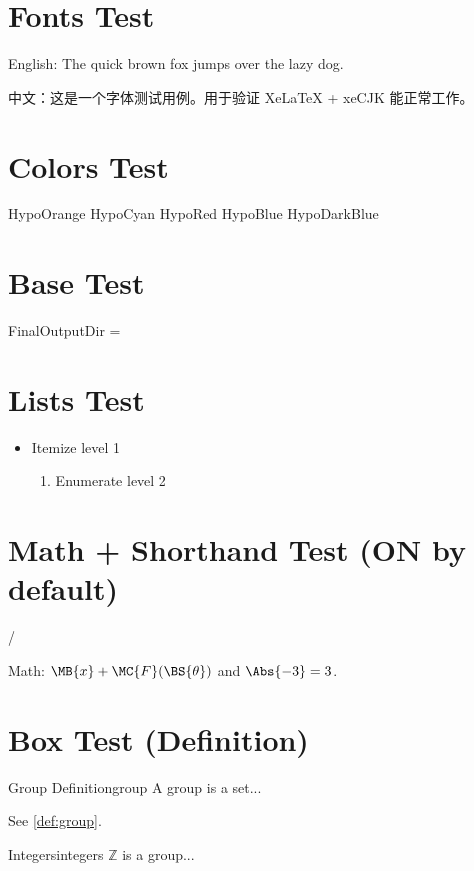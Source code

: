 \documentclass{article}
\begin{document}
\section*{Fonts Test}

English: The quick brown fox jumps over the lazy dog.

中文：这是一个字体测试用例。用于验证 XeLaTeX + xeCJK 能正常工作。

\section*{Colors Test}
{\color{HypoOrange}HypoOrange}\quad
{\color{HypoCyan}HypoCyan}\quad
{\color{HypoRed}HypoRed}\quad
{\color{HypoBlue}HypoBlue}\quad
{\color{HypoDarkBlue}HypoDarkBlue}

\section*{Base Test}
FinalOutputDir = \texttt{\FinalOutputDir}

\section*{Lists Test}
\begin{itemize}
  \item Itemize level 1
  \begin{enumerate}
    \item Enumerate level 2
  \end{enumerate}
\end{itemize}

\section*{Math + Shorthand Test (ON by default)}
 / 

Math: $\MB{x} + \MC{F}(\BS{\theta})$ and $\Abs{-3} = 3$.

\section*{Box Test (Definition)}
\begin{definition}{Group Definition}{group}
  A group is a set...
\end{definition}

See \cref{def:group}.

\begin{example}{Integers}{integers}
  $\mathbb{Z}$ is a group...
\end{example}
\end{document}
